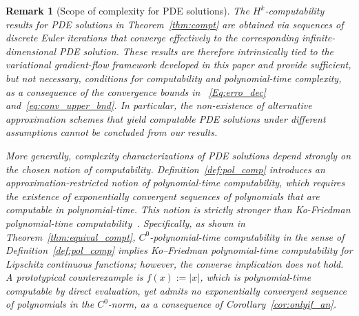 \documentclass[pdflatex]{sn-jnl}%
\newtheorem{remark}[theorem]{Remark}
\begin{document}
\begin{remark}[Scope of complexity for PDE solutions]\label{rk:Complexity_PDEs}
The $H^{k}$-computability results for PDE solutions in
Theorem~\ref{thm:compt} are obtained via sequences of discrete Euler iterations
that converge effectively to the corresponding infinite-dimensional PDE solution.
These results are therefore intrinsically tied to the variational gradient-flow
framework developed in this paper and provide \emph{sufficient, but not
necessary}, conditions for computability and polynomial-time complexity, as a consequence of the convergence bounds in ~\eqref{Eq:erro_dec} and~\eqref{eq:conv_upper_bnd}. In particular, the non-existence of alternative approximation schemes that yield computable PDE solutions under different assumptions cannot be concluded from our results.

More generally, complexity characterizations of PDE solutions depend strongly on
the chosen notion of computability. Definition~\ref{def:pol_comp} introduces an
\emph{approximation-restricted} notion of polynomial-time computability, which
requires the existence of exponentially convergent sequences of polynomials that are computable in polynomial-time. This notion is strictly stronger than
Ko-Friedman polynomial-time computability~\cite{Steinberg2017}. Specifically, as shown in Theorem~\ref{thm:equival_compt}, $C^0$-polynomial-time computability in the sense of Definition~\ref{def:pol_comp} implies Ko–Friedman polynomial-time computability for Lipschitz continuous functions; however, the converse implication does not hold. A prototypical counterexample is $f(x):=|x|$, which is
polynomial-time computable by direct evaluation, yet admits no exponentially
convergent sequence of polynomials in the $C^0$-norm, as a consequence of Corollary~\ref{cor:onlyif_an}.
\end{remark}
\end{document}

